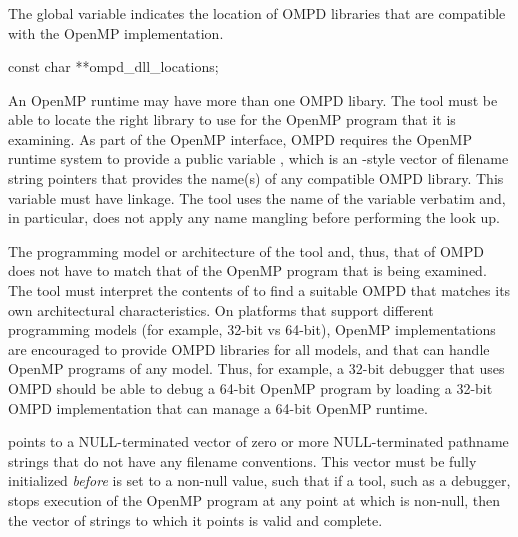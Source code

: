 \subsubsection{}
\label{subsubsec:ompd_dll_locations}

\summary
The  global variable indicates the location
of OMPD libraries that are compatible with the OpenMP implementation.

\format
\begin{cspecific}
\begin{ompSyntax}
const char **ompd_dll_locations;
\end{ompSyntax}
\end{cspecific}

\descr
An OpenMP runtime may have more than one OMPD libary. The tool must be able 
to locate the right library to use for the OpenMP program that it is examining.
As part of the OpenMP interface, OMPD requires the OpenMP runtime system to
provide a public variable , which is an -style
vector of filename string pointers that provides the name(s) of any compatible 
OMPD library. This variable must have  linkage. The tool uses the name 
of the variable verbatim and, in particular, does not apply any name mangling 
before performing the look up.

The programming model or architecture of the tool and, thus, that of OMPD does 
not have to match that of the OpenMP program that is being examined. The tool
must interpret the contents of  to find a suitable OMPD 
that matches its own architectural characteristics. On platforms that support 
different programming models (for example, 32-bit vs 64-bit), OpenMP 
implementations are encouraged to provide OMPD libraries for all models, and 
that can handle OpenMP programs of any model. Thus, for example, a 32-bit 
debugger that uses OMPD should be able to debug a 64-bit OpenMP program by 
loading a 32-bit OMPD implementation that can manage a 64-bit OpenMP runtime.

 points to a NULL-terminated vector of zero or more 
NULL-terminated pathname strings that do not have any filename conventions. 
This vector must be fully initialized \emph{before}  
is set to a non-null value, such that if a tool, such as a debugger, stops 
execution of the OpenMP program at any point at which  
is non-null, then the vector of strings to which it points is valid and complete.

